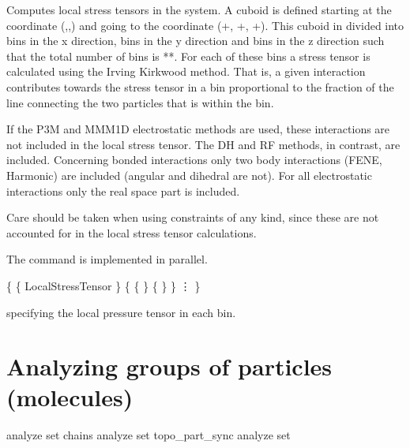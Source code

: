 Computes local stress tensors in the system.  A cuboid is defined starting at the coordinate
(,,) and going to the coordinate
(+, +,
+).  This cuboid in divided into  bins in the x
direction,  bins in the y direction and  bins in the z direction such that
the total number of bins is **.  For each of these bins a stress
tensor is calculated using the Irving Kirkwood method.  That is, a given interaction contributes
towards the stress tensor in a bin proportional to the fraction of the line connecting the two
particles that is within the bin.

If the P3M and MMM1D electrostatic methods are used, these
interactions are not included in the local stress tensor.  The DH and
RF methods, in contrast, are included. Concerning bonded interactions 
only two body interactions (FENE, Harmonic) are included (angular and dihedral are not).
For all electrostatic interactions only the real space part is included.

Care should be taken when using constraints of any kind, since these are not accounted for
in the local stress tensor calculations. 

The command is implemented in parallel.


\begin{code}
\{ \{ LocalStressTensor \}
   \{ \{    \} \{  \} \}
      \vdots
\}
\end{code}
specifying the local pressure tensor in each bin.

\section{Analyzing groups of particles (molecules)}
\label{analyze:set}

\begin{essyntax}
   analyze set chains 
   analyze set topo\_part\_sync
   analyze set
\end{essyntax}


